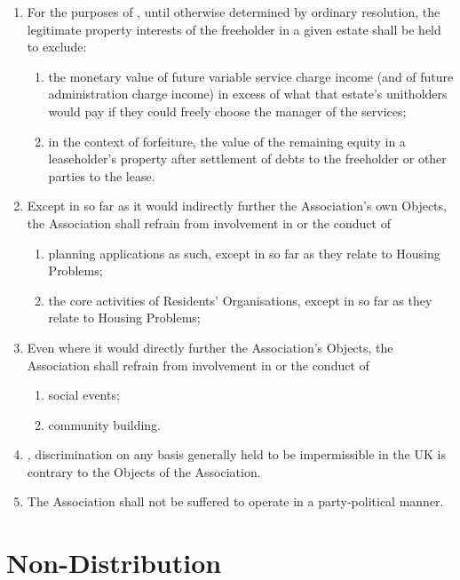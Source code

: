 \documentclass[10pt]{mk-articles-of-association}
\newcommand{\mysection}[1]{
  \end{enumerate}
  \section*{#1}
  \begin{enumerate}[resume]
}
\newcommand{\RA}[0]{Residents' Organisation}
\begin{document}
\begin{enumerate}
\item For the purposes of , until otherwise determined by
  ordinary resolution, the legitimate property
  interests of the freeholder in a given estate shall be held to
  exclude:
  \begin{enumerate}
    \item the monetary value of future variable service charge income
      (and of future administration charge income) in excess of what
      that estate's unitholders would pay if they could freely choose
      the manager of the services; \ITand
    \item in the context of forfeiture, the value of the remaining equity in a
      leaseholder's property after settlement of debts to the freeholder or
      other parties to the lease.
  \end{enumerate}

\item Except in so far as it would indirectly further the Association's own
  Objects, the Association shall refrain from involvement in or the conduct of
  \begin{enumerate}
  \item planning applications as such, except in so far as they relate
    to Housing Problems;
  \item the core activities of \RA{}s, except in so far as they
    relate to Housing Problems;
  \end{enumerate}

\item Even where it would directly further the Association's Objects,
  the Association shall refrain from involvement in or the conduct of
  \begin{enumerate}
  \item social events; \ITand
  \item community building.
  \end{enumerate}

\item \avoiddoubt, discrimination on any basis generally held to be
  impermissible in the UK is contrary to the Objects of the
  Association.

\item The Association shall not be suffered to operate in
  a party-political manner.



\mysection{Non-Distribution}


\end{enumerate}
\end{document}
